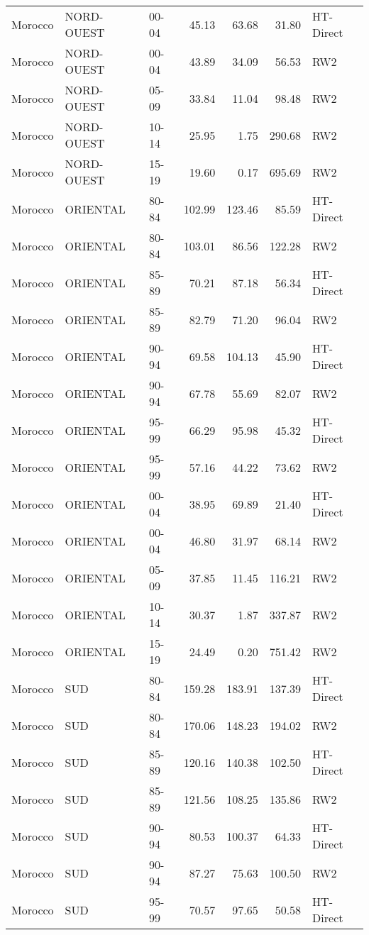 \begin{longtable}{lllrrrl}
  Morocco & NORD-OUEST & 00-04 & 45.13 & 63.68 & 31.80 & HT-Direct \\ 
  Morocco & NORD-OUEST & 00-04 & 43.89 & 34.09 & 56.53 & RW2 \\ 
  Morocco & NORD-OUEST & 05-09 & 33.84 & 11.04 & 98.48 & RW2 \\ 
  Morocco & NORD-OUEST & 10-14 & 25.95 & 1.75 & 290.68 & RW2 \\ 
  Morocco & NORD-OUEST & 15-19 & 19.60 & 0.17 & 695.69 & RW2 \\ 
  Morocco & ORIENTAL & 80-84 & 102.99 & 123.46 & 85.59 & HT-Direct \\ 
  Morocco & ORIENTAL & 80-84 & 103.01 & 86.56 & 122.28 & RW2 \\ 
  Morocco & ORIENTAL & 85-89 & 70.21 & 87.18 & 56.34 & HT-Direct \\ 
  Morocco & ORIENTAL & 85-89 & 82.79 & 71.20 & 96.04 & RW2 \\ 
  Morocco & ORIENTAL & 90-94 & 69.58 & 104.13 & 45.90 & HT-Direct \\ 
  Morocco & ORIENTAL & 90-94 & 67.78 & 55.69 & 82.07 & RW2 \\ 
  Morocco & ORIENTAL & 95-99 & 66.29 & 95.98 & 45.32 & HT-Direct \\ 
  Morocco & ORIENTAL & 95-99 & 57.16 & 44.22 & 73.62 & RW2 \\ 
  Morocco & ORIENTAL & 00-04 & 38.95 & 69.89 & 21.40 & HT-Direct \\ 
  Morocco & ORIENTAL & 00-04 & 46.80 & 31.97 & 68.14 & RW2 \\ 
  Morocco & ORIENTAL & 05-09 & 37.85 & 11.45 & 116.21 & RW2 \\ 
  Morocco & ORIENTAL & 10-14 & 30.37 & 1.87 & 337.87 & RW2 \\ 
  Morocco & ORIENTAL & 15-19 & 24.49 & 0.20 & 751.42 & RW2 \\ 
  Morocco & SUD & 80-84 & 159.28 & 183.91 & 137.39 & HT-Direct \\ 
  Morocco & SUD & 80-84 & 170.06 & 148.23 & 194.02 & RW2 \\ 
  Morocco & SUD & 85-89 & 120.16 & 140.38 & 102.50 & HT-Direct \\ 
  Morocco & SUD & 85-89 & 121.56 & 108.25 & 135.86 & RW2 \\ 
  Morocco & SUD & 90-94 & 80.53 & 100.37 & 64.33 & HT-Direct \\ 
  Morocco & SUD & 90-94 & 87.27 & 75.63 & 100.50 & RW2 \\ 
  Morocco & SUD & 95-99 & 70.57 & 97.65 & 50.58 & HT-Direct \\ 

\end{longtable}
